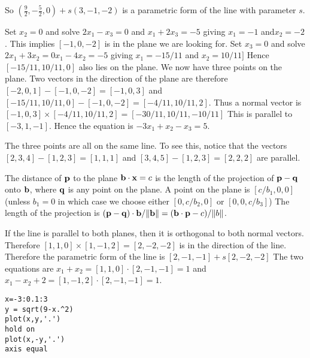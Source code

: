 So $\left(\frac{9}{2}, -\frac{5}{2}, 0  \right) + s(3,-1,-2)$ is a parametric form of the line with parameter $s$.





\vspace{2mm}
Set $x_2=0$ and solve $2x_1 -x_3=0$ and $x_1+2x_3=-5$ giving $x_1=-1$
and$x_2=-2$. This implies $[-1,0,-2]$ is in the plane we are looking for.
Set $x_3=0$ and solve $2x_1+3x_2=0x_1-4x_2=-5$ giving $x_1=-15/11$ and
$x_2=10/11]$ Hence $[-15/11,10/11,0]$ also lies on the plane. We now have
three points on the plane. Two vectors in the direction of the plane are
therefore  $[-2,0,1]-[-1,0,-2]=[-1,0,3]$
and$[-15/11,10/11,0]-[-1,0,-2]=[-4/11,10/11,2]$. Thus a normal vector is
$[-1,0,3]\times[-4/11,10/11,2]=[-30/11,10/11,-10/11]$ This is parallel to
$[-3,1,-1]$. Hence the equation is $-3x_1+x_2-x_3=5$.

\vspace{2mm}
The three points are all on the same line. To see this, notice that the vectors
$[2,3,4]-[1,2,3]=[1,1,1]$ and $[3,4,5]-[1,2,3]=[2,2,2]$ are parallel.

\vspace{2mm}
The distance of ${\bf p}$ to the plane ${\bf b}\cdot{\bf x}=c$ is the length of the
projection of ${\bf p}-{\bf q}$ onto ${\bf b}$, where ${\bf q}$ is any point on the plane.
A point on the plane is $[c/b_1,0,0]$ (unless $b_1=0$ in which case we choose
either $[0,c/b_2,0]$ or $[0,0,c/b_3]$) The length of the
projection is $({\bf p}-{\bf q})\cdot{\bf b}/\|{\bf b}\|=({\bf b}\cdot{\bf p}-c)/\|b\|$.

\vspace{2mm}
If the line is parallel to both planes, then it is orthogonal to both normal
vectors. Therefore $[1,1,0]\times[1,-1,2]=[2,-2,-2]$ is in the direction of
the line. Therefore the parametric form of the line is $[2,-1,-1]+s[2,-2,-2]$
The two equations are $x_1+x_2=[1,1,0]\cdot[2,-1,-1]=1$ and
$x_1-x_2+2=[1,-1,2]\cdot[2,-1,-1]=1$.

\vspace{2mm}
\begin{verbatim}
x=-3:0.1:3
y = sqrt(9-x.^2)
plot(x,y,'.')
hold on
plot(x,-y,'.')
axis equal
\end{verbatim}


